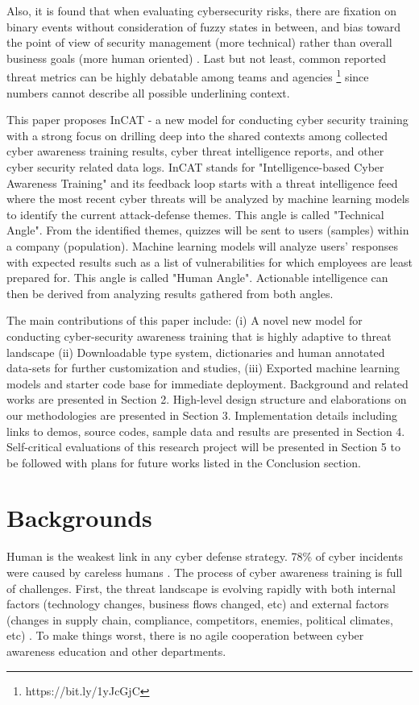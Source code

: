 \documentclass{article} %
\begin{document}
Also, it is found that when evaluating cybersecurity risks, there are fixation on binary events without consideration of fuzzy states in between, and bias toward the point of view of security management (more technical) rather than overall business goals (more human oriented) \cite{Dhillon2011Developer-drivenTrenches} \cite{Bayuk2013SecurityConstruct}. Last but not least, common reported threat metrics can be highly debatable among teams and agencies \footnote{https://bit.ly/1yJcGjC} since numbers cannot describe all possible underlining context. 

This paper proposes InCAT - a new model for conducting cyber security training with a strong focus on drilling deep into the shared contexts among collected cyber awareness training results, cyber threat intelligence reports, and other cyber security related data logs. InCAT stands for "Intelligence-based Cyber Awareness Training" and its feedback loop starts with a threat intelligence feed where the most recent cyber threats will be analyzed by machine learning models to identify the current attack-defense themes. This angle is called "Technical Angle". From the identified themes, quizzes will be sent to users (samples) within a company (population). Machine learning models will analyze users' responses with expected results such as a list of vulnerabilities for which employees are least prepared for. This angle is called "Human Angle". Actionable intelligence can then be derived from analyzing results gathered from both angles.

The main contributions of this paper include: (i) A novel new model for conducting cyber-security awareness training that is highly adaptive to threat landscape (ii) Downloadable type system, dictionaries and human annotated data-sets for further customization and studies, (iii) Exported machine learning models and starter code base for immediate deployment. Background and related works are presented in Section 2. High-level design structure and elaborations on our methodologies are presented in Section 3. Implementation details including links to demos, source codes, sample data and results are presented in Section 4. Self-critical evaluations of this research project will be presented in Section 5 to be followed with plans for future works listed in the Conclusion section.

\section{Backgrounds}
Human is the weakest link in any cyber defense strategy. 78\% of cyber incidents were caused by careless humans \cite{20172017Overview}. The process of cyber awareness training is full of challenges. First, the threat landscape is evolving rapidly with both internal factors (technology changes, business flows changed, etc) and external factors (changes in supply chain, compliance, competitors, enemies, political climates, etc) \cite{Ingalsbe2008ThreatEnd, Manadhata2011AnMetric}. To make things worst, there is no agile cooperation between cyber awareness education and other departments. 
\end{document}
